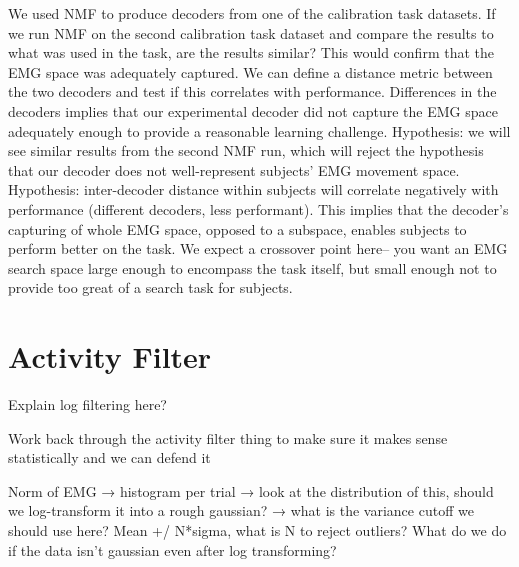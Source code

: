 \documentclass[../main.tex]{subfiles}
\begin{document}
We used NMF to produce decoders from one of the calibration task datasets. If we run NMF on the second calibration task dataset and compare the results to what was used in the task, are the results similar? This would confirm that the EMG space was adequately captured. We can define a distance metric between the two decoders and test if this correlates with performance. Differences in the decoders implies that our experimental decoder did not capture the EMG space adequately enough to provide a reasonable learning challenge.
Hypothesis: we will see similar results from the second NMF run, which will reject the hypothesis that our decoder does not well-represent subjects’ EMG movement space.
Hypothesis: inter-decoder distance within subjects will correlate negatively with performance (different decoders, less performant). This implies that the decoder’s capturing of whole EMG space, opposed to a subspace, enables subjects to perform better on the task. We expect a crossover point here– you want an EMG search space large enough to encompass the task itself, but small enough not to provide too great of a search task for subjects.





\section{Activity Filter}


Explain log filtering here?


Work back through the activity filter thing to make sure it makes sense statistically and we can defend it

Norm of EMG → histogram per trial → look at the distribution of this, should we log-transform it into a rough gaussian? → what is the variance cutoff we should use here? Mean +/ N*sigma, what is N to reject outliers? What do we do if the data isn’t gaussian even after log transforming?
\end{document}
